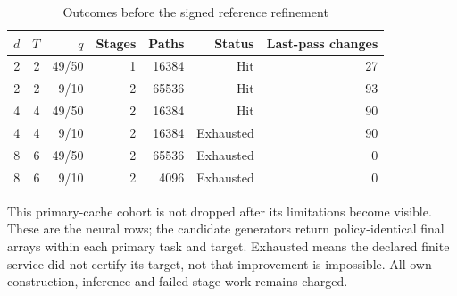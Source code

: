 \begin{table}[htbp]
\centering
\caption{Outcomes before the signed reference refinement}\label{tab:stopping56}
{\small\setlength{\tabcolsep}{4pt}
\begin{tabular}{rrrrrrr}
\toprule
$d$ & $T$ & $q$ & Stages & Paths & Status & Last-pass changes \\
\midrule
2 & 2 & 49/50 & 1 & 16384 & Hit & 27 \\
2 & 2 & 9/10 & 2 & 65536 & Hit & 93 \\
4 & 4 & 49/50 & 2 & 16384 & Hit & 90 \\
4 & 4 & 9/10 & 2 & 16384 & Exhausted & 90 \\
8 & 6 & 49/50 & 2 & 65536 & Exhausted & 0 \\
8 & 6 & 9/10 & 2 & 4096 & Exhausted & 0 \\
\bottomrule
\end{tabular}}
\par\smallskip
{\footnotesize This primary-cache cohort is not dropped after its limitations become visible. These are the neural rows; the candidate generators return policy-identical final arrays within each primary task and target. Exhausted means the declared finite service did not certify its target, not that improvement is impossible. All own construction, inference and failed-stage work remains charged.}
\end{table}

